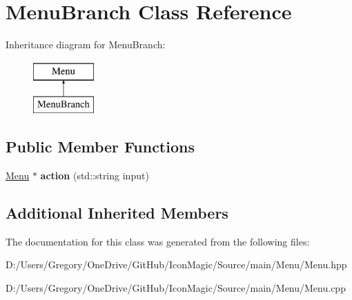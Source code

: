 \hypertarget{class_menu_branch}{}\section{Menu\+Branch Class Reference}
\label{class_menu_branch}
Inheritance diagram for Menu\+Branch\+:\begin{figure}[H]
\begin{center}
\leavevmode
\includegraphics[height=2.000000cm]{class_menu_branch}
\end{center}
\end{figure}
\subsection*{Public Member Functions}
\begin{DoxyCompactItemize}
\item 
\hypertarget{class_menu_branch_aed402cc6b56fc8721b7901337b8bcf4c}{}\hyperlink{class_menu}{Menu} $\ast$ {\bfseries action} (std\+::string input)\label{class_menu_branch_aed402cc6b56fc8721b7901337b8bcf4c}

\end{DoxyCompactItemize}
\subsection*{Additional Inherited Members}


The documentation for this class was generated from the following files\+:\begin{DoxyCompactItemize}
\item 
D\+:/\+Users/\+Gregory/\+One\+Drive/\+Git\+Hub/\+Icon\+Magic/\+Source/main/\+Menu/Menu.\+hpp\item 
D\+:/\+Users/\+Gregory/\+One\+Drive/\+Git\+Hub/\+Icon\+Magic/\+Source/main/\+Menu/Menu.\+cpp\end{DoxyCompactItemize}
